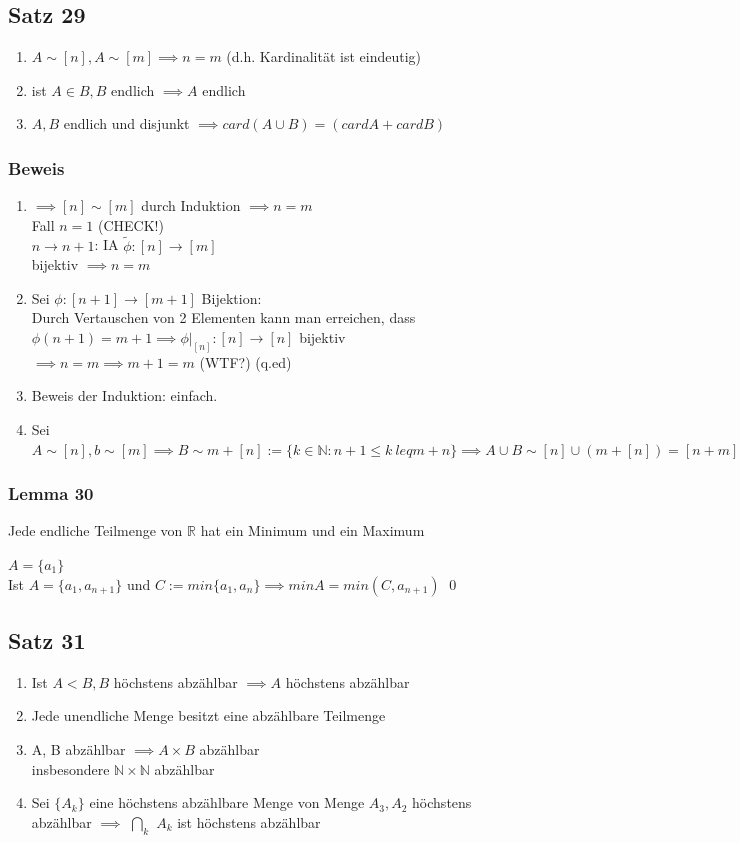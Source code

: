 \documentclass[fleqn]{scrbook}
\renewenvironment{proof}{{\bfseries Beweis }}{\qed}
\begin{document}
\subsection{Satz 29}
\begin{enumerate}[1)]
\item $A\sim [n], A\sim [m] \implies n = m$ (d.h. Kardinalität ist eindeutig)
\item ist $A \in B, B$ endlich $\implies A$ endlich
\item $A, B$ endlich und disjunkt $\implies card(A\cup B) = (cardA + cardB)$
\end{enumerate}
\subsubsection{Beweis}
\begin{enumerate}[1)]
\item $\implies [n] \sim [m]$ durch Induktion $\implies n = m$\\Fall $n = 1$ (CHECK!)\\$n\rightarrow n + 1$: IA $\tilde{\phi}:[n]\rightarrow [m]$\\bijektiv $\implies n = m$\item Sei $\phi:[n+1]\rightarrow[m+1]$ Bijektion:\\Durch Vertauschen von 2 Elementen kann man erreichen, dass $\phi (n + 1) = m+1 \implies \phi |_{[n]}:[n]\rightarrow [n]$ bijektiv $\implies n = m \implies  m + 1 = m$ (WTF?) (q.ed)
\item Beweis der Induktion: einfach.
\item Sei $A \sim [n], b \sim [m] \implies B \sim m + [n] := \{ k \in \mathbb{N}: n + 1 \leq k \ leq m + n \} \implies A \cup B \sim [n] \cup (m + [n]) = [n + m]$
\end{enumerate}
\subsubsection{Lemma 30} Jede endliche Teilmenge von $\mathbb{R}$ hat ein Minimum und ein Maximum

\begin{proof}
$A = \{a_1\}$\\Ist $A = \{a_1, a_{n+1}\}$ und $C:= min\{a_1, a_n\} \implies minA = min(C, a_{n+1})$
\end{proof}
\subsection{Satz 31}
\begin{enumerate}[1)]
\item Ist $A<B,B$ höchstens abzählbar $\implies A$ höchstens abzählbar
\item Jede unendliche Menge besitzt eine abzählbare Teilmenge
\item A, B abzählbar $\implies A \times B$ abzählbar\\ insbesondere $\mathbb{N} \times \mathbb{N}$ abzählbar
\item Sei $\{A_k\}$ eine höchstens abzählbare Menge von Menge $A_3, A_2$ höchstens abzählbar $\implies$ $\bigcap_k$ $A_k$ ist höchstens abzählbar
\end{enumerate}
\end{document}
